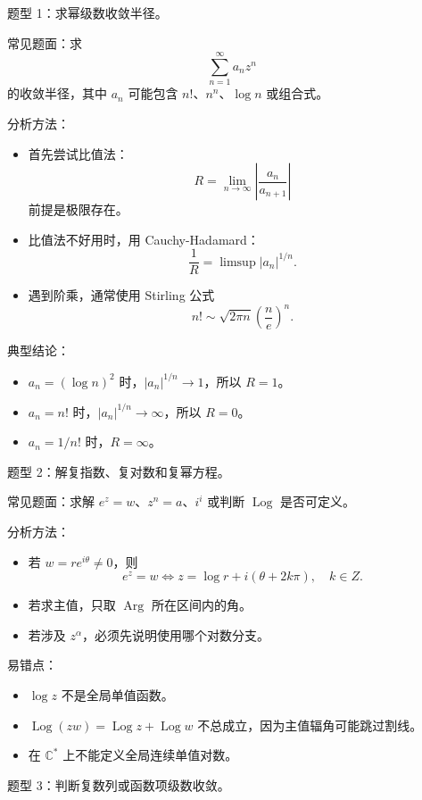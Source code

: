 \documentclass{article}
\DeclareMathOperator{\Log}{Log}
\DeclareMathOperator{\Arg}{Arg}
\begin{document}
题型 1：求幂级数收敛半径。

常见题面：求 \[
\sum_{n=1}^{\infty}a_n z^n
\] 的收敛半径，其中 $a_n$ 可能包含
$n!$、$n^n$、$\log n$ 或组合式。

分析方法：

\begin{itemize}
\item
  首先尝试比值法： \[
  R=\lim_{n\to\infty}\left|\frac{a_n}{a_{n+1}}\right|
  \] 前提是极限存在。
\item
  比值法不好用时，用 Cauchy-Hadamard： \[
  \frac1R=\limsup |a_n|^{1/n}.
  \]
\item
  遇到阶乘，通常使用 Stirling 公式 \[
  n!\sim \sqrt{2\pi n}\left(\frac ne\right)^n.
  \]
\end{itemize}

典型结论：

\begin{itemize}
\item
  $a_n=(\log n)^2$
  时，$|a_n|^{1/n}\to 1$，所以
  $R=1$。
\item
  $a_n=n!$
  时，$|a_n|^{1/n}\to\infty$，所以
  $R=0$。
\item
  $a_n=1/n!$ 时，$R=\infty$。
\end{itemize}

题型 2：解复指数、复对数和复幂方程。

常见题面：求解 $e^z=w$、$z^n=a$、$i^i$
或判断 $\Log$ 是否可定义。

分析方法：

\begin{itemize}
\item
  若 \(w=re^{i\theta}\ne 0\)，则
  \[
  e^z=w \Longleftrightarrow z=\log r+i(\theta+2k\pi),\quad k\in Z.
  \]
\item
  若求主值，只取 $\Arg$ 所在区间内的角。
\item
  若涉及 \(z^\alpha\)，必须先说明使用哪个对数分支。
\end{itemize}

易错点：

\begin{itemize}
\item
  \(\log z\) 不是全局单值函数。
\item
  \(\Log(zw)=\Log z+\Log w\) 不总成立，因为主值辐角可能跳过割线。
\item
  在 \(\mathbb C^*\) 上不能定义全局连续单值对数。
\end{itemize}

题型 3：判断复数列或函数项级数收敛。
\end{document}
